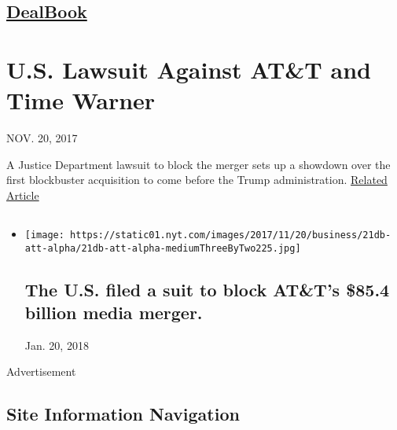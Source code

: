 \hypertarget{-dealbook-}{%
\subsection{\texorpdfstring{ \href{/section/business/dealbook}{DealBook}
}{ DealBook }}\label{-dealbook-}}

\hypertarget{us-lawsuit-against-att-and-time-warner}{%
\section{U.S. Lawsuit Against AT\&T and Time
Warner}\label{us-lawsuit-against-att-and-time-warner}}

NOV. 20, 2017

A Justice Department lawsuit to block the merger sets up a showdown over
the first blockbuster acquisition to come before the Trump
administration.
\href{https://www.nytimes.com/2017/11/20/business/dealbook/att-time-warner-merger.html}{Related
Article}

\subsection{}

\begin{itemize}
\item
  \href{https://www.nytimes.com/2017/11/20/business/dealbook/att-time-warner-merger.html}{}

  \texttt{[image: https://static01.nyt.com/images/2017/11/20/business/21db-att-alpha/21db-att-alpha-mediumThreeByTwo225.jpg]}

  \hypertarget{the-us-filed-a-suit-to-block-atts-854-billion-media-merger}{%
  \subsection{The U.S. filed a suit to block AT\&T's \$85.4 billion
  media
  merger.}\label{the-us-filed-a-suit-to-block-atts-854-billion-media-merger}}

  Jan. 20, 2018
\end{itemize}

Advertisement

\hypertarget{site-information-navigation}{%
\subsection{Site Information
Navigation}\label{site-information-navigation}}

